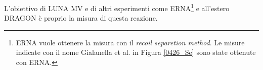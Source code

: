 \noindent L'obiettivo di LUNA MV e di altri esperimenti come ERNA\footnote{ERNA vuole ottenere la misura con il \textit{recoil separetion method}. Le misure indicate con il nome Gialanella et al. in Figura \ref{0426_Se} sono state ottenute con ERNA.} e all'estero DRAGON è proprio la misura di questa reazione.